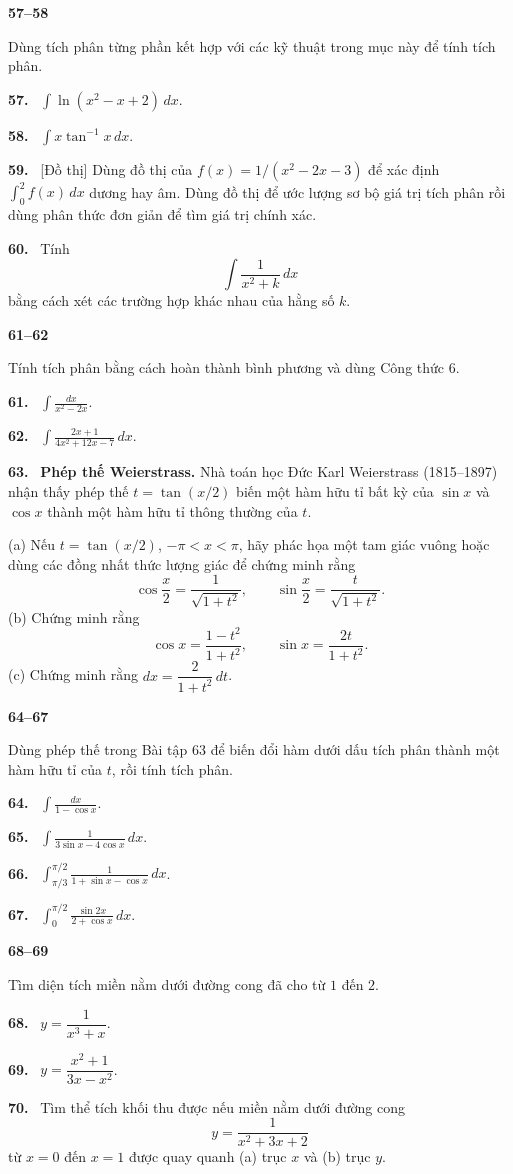 \documentclass[12pt,a4paper]{article}
\newcommand{\bt}[1]{\par\smallskip\Needspace{5\baselineskip}\noindent\textbf{#1.}\ }
\newcommand{\group}[1]{\par\Needspace{11\baselineskip}\medskip\noindent\textbf{#1}\par\nopagebreak[4]}
\begin{document}
\group{57–58} Dùng tích phân từng phần kết hợp với các kỹ thuật trong mục này để tính tích phân.
\bt{57} $\displaystyle\int\ln(x^2-x+2)\,dx$.
\bt{58} $\displaystyle\int x\tan^{-1}x\,dx$.

\bt{59} \textsf{[Đồ thị]} Dùng đồ thị của $f(x)=1/(x^2-2x-3)$ để xác định $\int_0^2 f(x)\,dx$ dương hay âm. Dùng đồ thị để ước lượng sơ bộ giá trị tích phân rồi dùng phân thức đơn giản để tìm giá trị chính xác.

\bt{60} Tính
\[\int\frac1{x^2+k}\,dx\]
bằng cách xét các trường hợp khác nhau của hằng số $k$.

\group{61–62} Tính tích phân bằng cách hoàn thành bình phương và dùng Công thức 6.
\bt{61} $\displaystyle\int\frac{dx}{x^2-2x}$.
\bt{62} $\displaystyle\int\frac{2x+1}{4x^2+12x-7}\,dx$.

\par\noindent\begin{minipage}[t]{\linewidth}
\bt{63} \textbf{Phép thế Weierstrass.} Nhà toán học Đức Karl Weierstrass (1815–1897) nhận thấy phép thế $t=\tan(x/2)$ biến một hàm hữu tỉ bất kỳ của $\sin x$ và $\cos x$ thành một hàm hữu tỉ thông thường của $t$.

(a) Nếu $t=\tan(x/2)$, $-\pi<x<\pi$, hãy phác họa một tam giác vuông hoặc dùng các đồng nhất thức lượng giác để chứng minh rằng
\[\cos\frac x2=\frac1{\sqrt{1+t^2}},\qquad\sin\frac x2=\frac t{\sqrt{1+t^2}}.\]
(b) Chứng minh rằng
\[\cos x=\frac{1-t^2}{1+t^2},\qquad\sin x=\frac{2t}{1+t^2}.\]
(c) Chứng minh rằng $dx=\dfrac2{1+t^2}\,dt$.

\end{minipage}\par
\group{64–67} Dùng phép thế trong Bài tập 63 để biến đổi hàm dưới dấu tích phân thành một hàm hữu tỉ của $t$, rồi tính tích phân.
\bt{64} $\displaystyle\int\frac{dx}{1-\cos x}$.
\bt{65} $\displaystyle\int\frac1{3\sin x-4\cos x}\,dx$.
\bt{66} $\displaystyle\int_{\pi/3}^{\pi/2}\frac1{1+\sin x-\cos x}\,dx$.
\bt{67} $\displaystyle\int_0^{\pi/2}\frac{\sin2x}{2+\cos x}\,dx$.

\group{68–69} Tìm diện tích miền nằm dưới đường cong đã cho từ $1$ đến $2$.
\bt{68} $y=\dfrac1{x^3+x}$.
\bt{69} $y=\dfrac{x^2+1}{3x-x^2}$.

\bt{70} Tìm thể tích khối thu được nếu miền nằm dưới đường cong
\[y=\frac1{x^2+3x+2}\]
từ $x=0$ đến $x=1$ được quay quanh (a) trục $x$ và (b) trục $y$.
\end{document}
